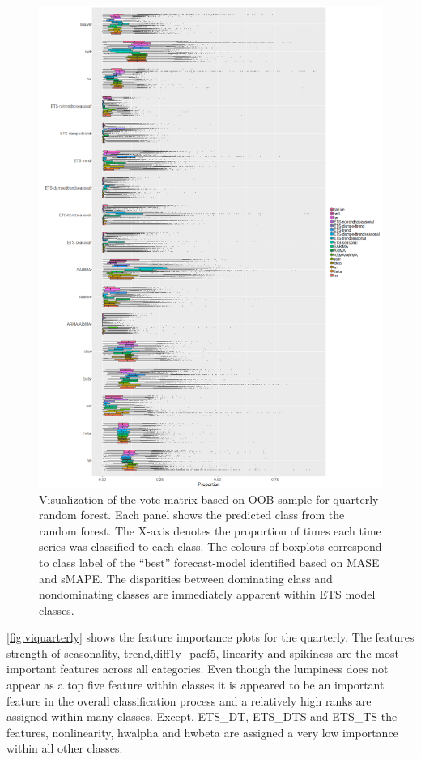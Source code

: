 \documentclass[11pt,a4paper,]{article}
\begin{document}
\begin{figure}
\centering
\includegraphics{figures/oobquarterly-1.png}
\caption{\label{fig:oobquarterly}Visualization of the vote matrix based on OOB sample for quarterly random forest. Each panel shows the predicted class from the random forest. The X-axis denotes the proportion of times each time series was classified to each class. The colours of boxplots correspond to class label of the ``best'' forecast-model identified based on MASE and sMAPE. The disparities between dominating class and nondominating classes are immediately apparent within ETS model classes.}
\end{figure}

\autoref{fig:viquarterly} shows the feature importance plots for the quarterly. The features strength of seasonality, trend,diff1y\_pacf5, linearity and spikiness are the most important features across all categories. Even though the lumpiness does not appear as a top five feature within classes it is appeared to be an important feature in the overall classification process and a relatively high ranks are assigned within many classes. Except, ETS\_DT, ETS\_DTS and ETS\_TS the features, nonlinearity, hwalpha and hwbeta are assigned a very low importance within all other classes.
\end{document}
